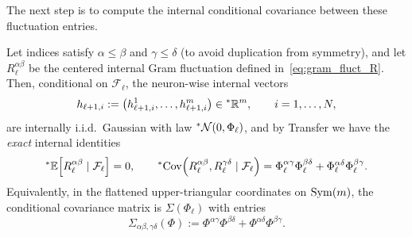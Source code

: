 The next step is to compute the internal conditional covariance between these fluctuation entries.

\begin{proposition}\label{prop:isserlis_gram}
Let indices satisfy $\alpha \le \beta$ and $\gamma \le \delta$ (to avoid duplication from symmetry), and let $R_\ell^{\alpha\beta}$ be the centered internal Gram fluctuation defined in~\eqref{eq:gram_fluct_R}. Then, conditional on $\mathcal{F}_\ell$, the neuron-wise internal vectors
\begin{equation}\label{eq:neuron_vec_linear}
h_{\ell+1,i} := \left(h_{\ell+1,i}^1, \dots, h_{\ell+1,i}^m\right) \in {}^*\mathbb{R}^m, \qquad i = 1, \dots, N,
\end{equation}
are internally i.i.d.\ Gaussian with law ${}^*\mathcal{N}(0, \Phi_\ell)$, and by Transfer we have the \emph{exact} internal identities
\begin{equation}\label{eq:isserlis_cov_identities}
{}^*\mathbb{E}\!\left[R_\ell^{\alpha\beta} \mid \mathcal{F}_\ell\right] = 0, \qquad {}^*\!\operatorname{Cov}\!\left(R_\ell^{\alpha\beta}, R_\ell^{\gamma\delta} \mid \mathcal{F}_\ell\right) = \Phi_\ell^{\alpha\gamma}\Phi_\ell^{\beta\delta} + \Phi_\ell^{\alpha\delta}\Phi_\ell^{\beta\gamma}.
\end{equation}
Equivalently, in the flattened upper-triangular coordinates on $\operatorname{Sym}(m)$, the conditional covariance matrix is $\Sigma(\Phi_\ell)$ with entries
\begin{equation}\label{eq:sigma_tensor_def}
\Sigma_{\alpha\beta,\gamma\delta}(\Phi) := \Phi^{\alpha\gamma}\Phi^{\beta\delta} + \Phi^{\alpha\delta}\Phi^{\beta\gamma}.
\end{equation}
\end{proposition}

